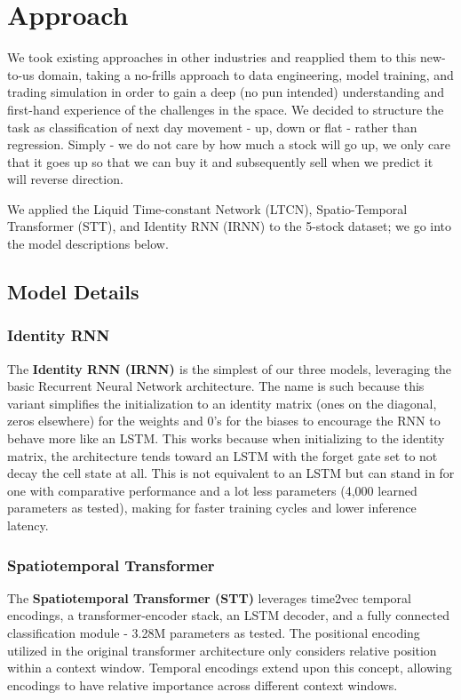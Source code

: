 \documentclass[10pt,twocolumn,letterpaper]{article}
\begin{document}
    \section{Approach}
We took existing approaches in other industries and reapplied them to this new-to-us domain, taking a no-frills approach to data engineering, model training, and trading simulation in order to gain a deep (no pun intended) understanding and first-hand experience of the challenges in the space. We decided to structure the task as classification of next day movement - up, down or flat - rather than regression. Simply - we do not care by how much a stock will go up, we only care that it goes up so that we can buy it and subsequently sell when we predict it will reverse direction.

We applied the  Liquid Time-constant Network (LTCN), Spatio-Temporal Transformer (STT), and Identity RNN (IRNN) to the 5-stock dataset; we go into the model descriptions below.

    \subsection{Model Details}

    \subsubsection{Identity RNN}

    The \textbf{Identity RNN (IRNN) \cite{irnn_initialize}} is the simplest of our three models, leveraging the basic Recurrent Neural Network architecture. The name is such because this variant simplifies the initialization to an identity matrix (ones on the diagonal, zeros elsewhere) for the weights and 0’s for the biases to encourage the RNN to behave more like an LSTM. This works because when initializing to the identity matrix, the architecture tends toward an LSTM with the forget gate set to not decay the cell state at all. This is not equivalent to an LSTM but can stand in for one with comparative performance and a lot less parameters (4,000 learned parameters as tested), making for faster training cycles and lower inference latency.

    \subsubsection{Spatiotemporal Transformer}

    The \textbf{Spatiotemporal Transformer (STT)} leverages time2vec temporal encodings, a transformer-encoder stack, an LSTM decoder, and a fully connected classification module - 3.28M parameters as tested. The positional encoding utilized in the original transformer architecture only considers relative position within a context window. Temporal encodings extend upon this concept, allowing encodings to have relative importance across different context windows\cite{STT_Paper,time2vec,STLAT_sota,vaswani_attention_2023,BERT}.
\end{document}
